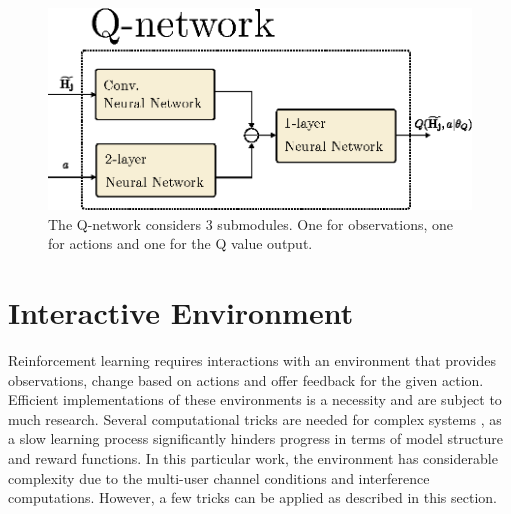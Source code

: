\begin{figure}
    \centering
    \includegraphics{chapters/part_uplink/figures/RL_Q_network.eps}
    \caption{The Q-network considers 3 submodules. One for observations, one for actions and one for the Q value output.}
    \label{fig:rl_q_network}
\end{figure}


\section{Interactive Environment}\label{sec:interactive_environment}
Reinforcement learning requires interactions with an environment that provides observations, change based on actions and offer feedback for the given action. Efficient implementations of these environments is a necessity and are subject to much research. Several computational tricks are needed for complex systems \cite{Hafner2017TensorFlowTensorFlow}, as a slow learning process significantly hinders progress in terms of model structure and reward functions. In this particular work, the environment has considerable complexity due to the multi-user channel conditions and interference computations. However, a few tricks can be applied as described in this section.

